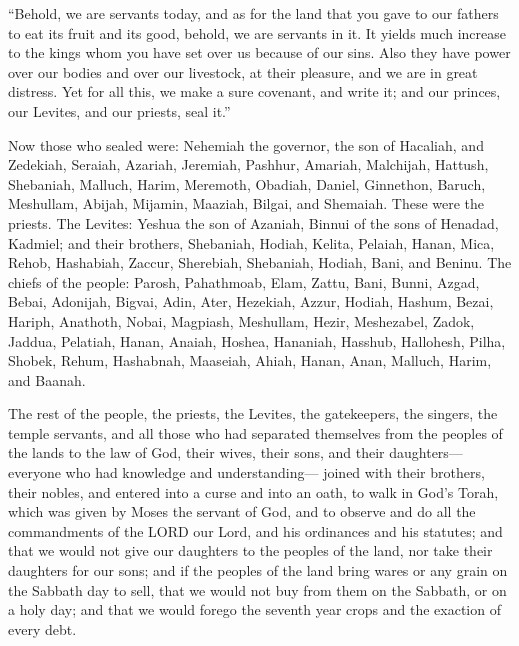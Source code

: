 \myverse{}“Behold, we are servants today, and as for the land that you
gave to our fathers to eat its fruit and its good, behold, we are servants in it.
\myverse{}It yields much increase to the kings whom you have set over us because of
our sins. Also they have power over our bodies and over our livestock, at their pleasure, and we are in
great distress.
\myverse{}Yet for all this, we make a sure covenant, and write it; and our princes,
our Levites, and our priests, seal it.”


\mychapter{} \myverse*{}Now those who sealed were: Nehemiah the governor, the son of Hacaliah,
and Zedekiah,
\myverse{}Seraiah, Azariah, Jeremiah,
\myverse{}Pashhur, Amariah, Malchijah,
\myverse{}Hattush, Shebaniah, Malluch,
\myverse{}Harim, Meremoth, Obadiah,
\myverse{}Daniel, Ginnethon, Baruch,
\myverse{}Meshullam, Abijah, Mijamin,
\myverse{}Maaziah, Bilgai, and Shemaiah. These were the priests.
\myverse{}The Levites: Yeshua the son of Azaniah, Binnui of the sons of Henadad, Kadmiel;
\myverse{}and their brothers, Shebaniah, Hodiah, Kelita, Pelaiah, Hanan,
\myverse{}Mica, Rehob, Hashabiah,
\myverse{}Zaccur, Sherebiah, Shebaniah,
\myverse{}Hodiah, Bani, and Beninu.
\myverse{}The chiefs of the people: Parosh, Pahathmoab, Elam, Zattu, Bani,
\myverse{}Bunni, Azgad, Bebai,
\myverse{}Adonijah, Bigvai, Adin,
\myverse{}Ater, Hezekiah, Azzur,
\myverse{}Hodiah, Hashum, Bezai,
\myverse{}Hariph, Anathoth, Nobai,
\myverse{}Magpiash, Meshullam, Hezir,
\myverse{}Meshezabel, Zadok, Jaddua,
\myverse{}Pelatiah, Hanan, Anaiah,
\myverse{}Hoshea, Hananiah, Hasshub,
\myverse{}Hallohesh, Pilha, Shobek,
\myverse{}Rehum, Hashabnah, Maaseiah,
\myverse{}Ahiah, Hanan, Anan,
\myverse{}Malluch, Harim, and Baanah.

\myverse{}The rest of the people, the priests, the Levites, the gatekeepers,
the singers, the temple servants, and all those who had separated themselves from the peoples of the lands
to the law of God, their wives, their sons, and their daughters—everyone who had knowledge and understanding—
\myverse{}joined with their brothers, their nobles, and entered into a curse and into
an oath, to walk in God’s Torah, which was given by Moses the servant of God, and to observe and do all
the commandments of the LORD our Lord, and his ordinances and his statutes;
\myverse{}and that we would not give our daughters to the peoples of the land, nor
take their daughters for our sons;
\myverse{}and if the peoples of the land bring wares or any grain on the Sabbath day
to sell, that we would not buy from them on the Sabbath, or on a holy day; and that we would forego the
seventh year crops and the exaction of every debt.

